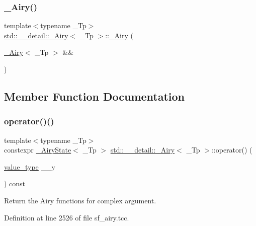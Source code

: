 \subsubsection{\texorpdfstring{\+\_\+\+Airy()}{\_Airy()}\hspace{0.1cm}{\footnotesize\ttfamily [3/3]}}
{\footnotesize\ttfamily template$<$typename \+\_\+\+Tp$>$ \\
\hyperlink{classstd_1_1____detail_1_1__Airy}{std\+::\+\_\+\+\_\+detail\+::\+\_\+\+Airy}$<$ \+\_\+\+Tp $>$\+::\hyperlink{classstd_1_1____detail_1_1__Airy}{\+\_\+\+Airy} (\begin{DoxyParamCaption}\item[{\hyperlink{classstd_1_1____detail_1_1__Airy}{\+\_\+\+Airy}$<$ \+\_\+\+Tp $>$ \&\&}]{ }\end{DoxyParamCaption})\hspace{0.3cm}{\ttfamily [default]}}



\subsection{Member Function Documentation}
\mbox{\label{classstd_1_1____detail_1_1__Airy_aae4af53f88751d35b028055a2f8c5e2b}} 
\subsubsection{\texorpdfstring{operator()()}{operator()()}}
{\footnotesize\ttfamily template$<$typename \+\_\+\+Tp$>$ \\
constexpr \hyperlink{structstd_1_1____detail_1_1__AiryState}{\+\_\+\+Airy\+State}$<$ \+\_\+\+Tp $>$ \hyperlink{classstd_1_1____detail_1_1__Airy}{std\+::\+\_\+\+\_\+detail\+::\+\_\+\+Airy}$<$ \+\_\+\+Tp $>$\+::operator() (\begin{DoxyParamCaption}\item[{\hyperlink{classstd_1_1____detail_1_1__Airy_a99e7e546930fbd7a846f6933a9b4b437}{value\+\_\+type}}]{\+\_\+\+\_\+y }\end{DoxyParamCaption}) const}

Return the Airy functions for complex argument. 

Definition at line 2526 of file sf\+\_\+airy.\+tcc.



